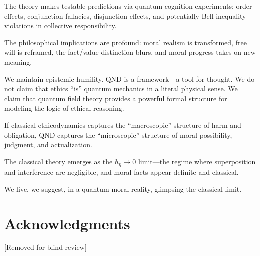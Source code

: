 \documentclass[12pt]{article}
\begin{document}
The theory makes testable predictions via quantum cognition experiments: order effects, conjunction fallacies, disjunction effects, and potentially Bell inequality violations in collective responsibility.

The philosophical implications are profound: moral realism is transformed, free will is reframed, the fact/value distinction blurs, and moral progress takes on new meaning.

We maintain epistemic humility. QND is a framework---a tool for thought. We do not claim that ethics ``is'' quantum mechanics in a literal physical sense. We claim that quantum field theory provides a powerful formal structure for modeling the logic of ethical reasoning.

If classical ethicodynamics captures the ``macroscopic'' structure of harm and obligation, QND captures the ``microscopic'' structure of moral possibility, judgment, and actualization.

The classical theory emerges as the $\hbar_\eta \to 0$ limit---the regime where superposition and interference are negligible, and moral facts appear definite and classical.

We live, we suggest, in a quantum moral reality, glimpsing the classical limit.

\section*{Acknowledgments}

[Removed for blind review]
\end{document}
